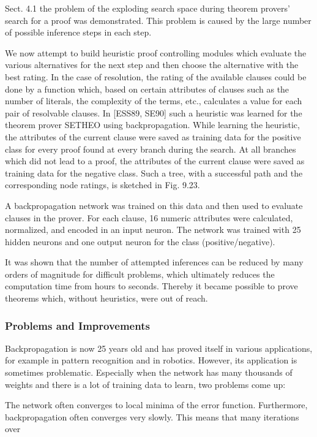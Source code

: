 \documentclass[10pt]{article}
\begin{document}
Sect. 4.1 the problem of the exploding search space during theorem provers' search for a proof was demonstrated. This problem is caused by the large number of possible inference steps in each step.

We now attempt to build heuristic proof controlling modules which evaluate the various alternatives for the next step and then choose the alternative with the best rating. In the case of resolution, the rating of the available clauses could be done by a function which, based on certain attributes of clauses such as the number of literals, the complexity of the terms, etc., calculates a value for each pair of resolvable clauses. In [ESS89, SE90] such a heuristic was learned for the theorem prover SETHEO using backpropagation. While learning the heuristic, the attributes of the current clause were saved as training data for the positive class for every proof found at every branch during the search. At all branches which did not lead to a proof, the attributes of the current clause were saved as training data for the negative class. Such a tree, with a successful path and the corresponding node ratings, is sketched in Fig. 9.23.

A backpropagation network was trained on this data and then used to evaluate clauses in the prover. For each clause, 16 numeric attributes were calculated, normalized, and encoded in an input neuron. The network was trained with 25 hidden neurons and one output neuron for the class (positive/negative).

It was shown that the number of attempted inferences can be reduced by many orders of magnitude for difficult problems, which ultimately reduces the computation time from hours to seconds. Thereby it became possible to prove theorems which, without heuristics, were out of reach.

\subsubsection*{Problems and Improvements}
Backpropagation is now 25 years old and has proved itself in various applications, for example in pattern recognition and in robotics. However, its application is sometimes problematic. Especially when the network has many thousands of weights and there is a lot of training data to learn, two problems come up:

The network often converges to local minima of the error function. Furthermore, backpropagation often converges very slowly. This means that many iterations over
\end{document}
